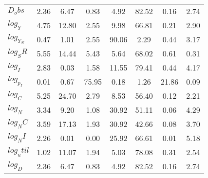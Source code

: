 \begin{center}
\begin{longtable}{lccccccc}
$D_obs     $	 & 	        2.36	 & 	        6.47	 & 	        0.83	 & 	        4.92	 & 	       82.52	 & 	        0.16	 & 	        2.74 \\ 
$log_Y     $	 & 	        4.75	 & 	       12.80	 & 	        2.55	 & 	        9.98	 & 	       66.81	 & 	        0.21	 & 	        2.90 \\ 
$log_Y_N   $	 & 	        0.47	 & 	        1.01	 & 	        2.55	 & 	       90.06	 & 	        2.29	 & 	        0.44	 & 	        3.17 \\ 
$log_SR    $	 & 	        5.55	 & 	       14.44	 & 	        5.43	 & 	        5.64	 & 	       68.02	 & 	        0.61	 & 	        0.31 \\ 
$log_I     $	 & 	        2.83	 & 	        0.03	 & 	        1.58	 & 	       11.55	 & 	       79.41	 & 	        0.44	 & 	        4.17 \\ 
$log_p_I   $	 & 	        0.01	 & 	        0.67	 & 	       75.95	 & 	        0.18	 & 	        1.26	 & 	       21.86	 & 	        0.09 \\ 
$log_C     $	 & 	        5.25	 & 	       24.70	 & 	        2.79	 & 	        8.53	 & 	       56.40	 & 	        0.12	 & 	        2.21 \\ 
$log_N     $	 & 	        3.34	 & 	        9.20	 & 	        1.08	 & 	       30.92	 & 	       51.11	 & 	        0.06	 & 	        4.29 \\ 
$log_NC    $	 & 	        3.59	 & 	       17.13	 & 	        1.93	 & 	       30.92	 & 	       42.66	 & 	        0.08	 & 	        3.70 \\ 
$log_NI    $	 & 	        2.26	 & 	        0.01	 & 	        0.00	 & 	       25.92	 & 	       66.61	 & 	        0.01	 & 	        5.18 \\ 
$log_util  $	 & 	        1.02	 & 	       11.07	 & 	        1.94	 & 	        5.03	 & 	       78.08	 & 	        0.31	 & 	        2.54 \\ 
$log_D     $	 & 	        2.36	 & 	        6.47	 & 	        0.83	 & 	        4.92	 & 	       82.52	 & 	        0.16	 & 	        2.74 \\ 
\end{longtable}
 \end{center}
